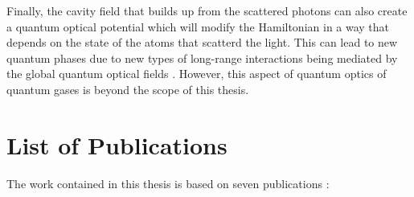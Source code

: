 Finally, the cavity field that builds up from the scattered photons
can also create a quantum optical potential which will modify the
Hamiltonian in a way that depends on the state of the atoms that
scatterd the light. This can lead to new quantum phases due to new
types of long-range interactions being mediated by the global quantum
optical fields \cite{caballero2015, caballero2015njp, caballero2016,
  caballero2016a, elliott2016}. However, this aspect of quantum optics
of quantum gases is beyond the scope of this thesis.

\newpage

\section*{List of Publications}

The work contained in this thesis is based on seven publications
\cite{kozlowski2015, elliott2015, atoms2015, mazzucchi2016,
  kozlowski2016zeno, mazzucchi2016njp, kozlowski2016phase}:

